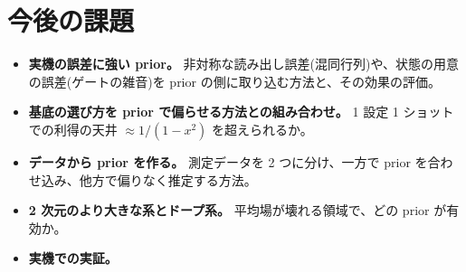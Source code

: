 \section{今後の課題}
\begin{itemize}
  \item \textbf{実機の誤差に強い prior。} 非対称な読み出し誤差(混同行列)や、状態の用意の誤差(ゲートの雑音)を prior の側に取り込む方法と、その効果の評価。
  \item \textbf{基底の選び方を prior で偏らせる方法との組み合わせ。} 1 設定 1 ショットでの利得の天井 $\approx1/(1-x^2)$ を超えられるか。
  \item \textbf{データから prior を作る。} 測定データを 2 つに分け、一方で prior を合わせ込み、他方で偏りなく推定する方法。
  \item \textbf{2 次元のより大きな系とドープ系。} 平均場が壊れる領域で、どの prior が有効か。
  \item \textbf{実機での実証。}
\end{itemize}
